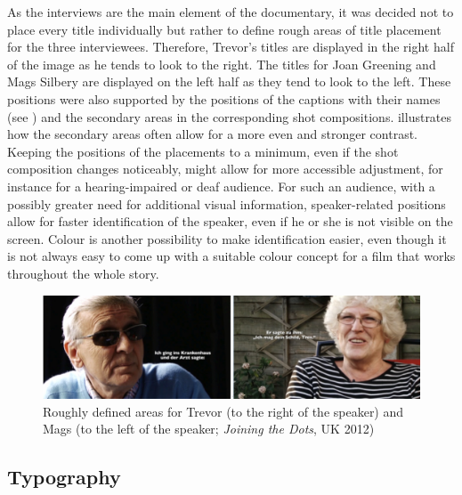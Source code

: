 \documentclass[output=paper]{langsci/langscibook}
\begin{document}
As the interviews are the main element of the documentary, it was decided not to place every title individually but rather to define rough areas of title placement for the three interviewees. Therefore, Trevor's titles are displayed in the right half of the image as he tends to look to the right. The titles for Joan Greening and Mags Silbery are displayed on the left half as they tend to look to the left. These positions were also supported by the positions of the captions with their names (see ) and the secondary areas in the corresponding shot compositions.  illustrates how the secondary areas often allow for a more even and stronger contrast. Keeping the positions of the placements to a minimum, even if the shot composition changes noticeably, might allow for more accessible adjustment, for instance for a hearing-impaired or deaf audience. For such an audience, with a possibly greater need for additional visual information, speaker-related positions allow for faster identification of the speaker, even if he or she is not visible on the screen. Colour is another possibility to make identification easier, even though it is not always easy to come up with a suitable colour concept for a film that works throughout the whole story.

\begin{figure}[t]
 \includegraphics[width=\textwidth]{figures/Fox5.png}
 \caption{Roughly defined areas for Trevor (to the right of the speaker) and Mags (to the left of the speaker; \textit{Joining the Dots}, UK 2012)}
 \label{fox:fig:5}
\end{figure} 

\subsection{Typography}
\end{document}
